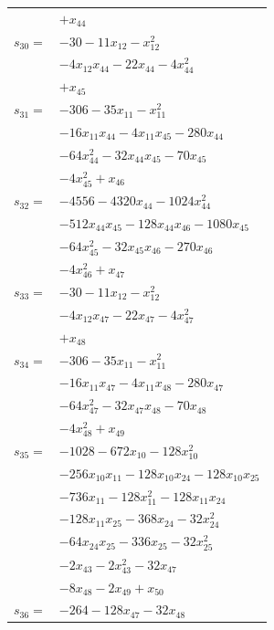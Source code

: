 \begin{longtable}{@{}r@{\;}l@{}}
 & \(\displaystyle +x_{44}\) \\[3pt]
\(s_{30}=\) & \(\displaystyle -30 -11x_{12} -x_{12}^{2}\) \\
 & \(\displaystyle -4x_{12}x_{44} -22x_{44} -4x_{44}^{2}\) \\
 & \(\displaystyle +x_{45}\) \\[3pt]
\(s_{31}=\) & \(\displaystyle -306 -35x_{11} -x_{11}^{2}\) \\
 & \(\displaystyle -16x_{11}x_{44} -4x_{11}x_{45} -280x_{44}\) \\
 & \(\displaystyle -64x_{44}^{2} -32x_{44}x_{45} -70x_{45}\) \\
 & \(\displaystyle -4x_{45}^{2} +x_{46}\) \\[3pt]
\(s_{32}=\) & \(\displaystyle -4556 -4320x_{44} -1024x_{44}^{2}\) \\
 & \(\displaystyle -512x_{44}x_{45} -128x_{44}x_{46} -1080x_{45}\) \\
 & \(\displaystyle -64x_{45}^{2} -32x_{45}x_{46} -270x_{46}\) \\
 & \(\displaystyle -4x_{46}^{2} +x_{47}\) \\[3pt]
\(s_{33}=\) & \(\displaystyle -30 -11x_{12} -x_{12}^{2}\) \\
 & \(\displaystyle -4x_{12}x_{47} -22x_{47} -4x_{47}^{2}\) \\
 & \(\displaystyle +x_{48}\) \\[3pt]
\(s_{34}=\) & \(\displaystyle -306 -35x_{11} -x_{11}^{2}\) \\
 & \(\displaystyle -16x_{11}x_{47} -4x_{11}x_{48} -280x_{47}\) \\
 & \(\displaystyle -64x_{47}^{2} -32x_{47}x_{48} -70x_{48}\) \\
 & \(\displaystyle -4x_{48}^{2} +x_{49}\) \\[3pt]
\(s_{35}=\) & \(\displaystyle -1028 -672x_{10} -128x_{10}^{2}\) \\
 & \(\displaystyle -256x_{10}x_{11} -128x_{10}x_{24} -128x_{10}x_{25}\) \\
 & \(\displaystyle -736x_{11} -128x_{11}^{2} -128x_{11}x_{24}\) \\
 & \(\displaystyle -128x_{11}x_{25} -368x_{24} -32x_{24}^{2}\) \\
 & \(\displaystyle -64x_{24}x_{25} -336x_{25} -32x_{25}^{2}\) \\
 & \(\displaystyle -2x_{43} -2x_{43}^{2} -32x_{47}\) \\
 & \(\displaystyle -8x_{48} -2x_{49} +x_{50}\) \\[3pt]
\(s_{36}=\) & \(\displaystyle -264 -128x_{47} -32x_{48}\) \\

\end{longtable}
